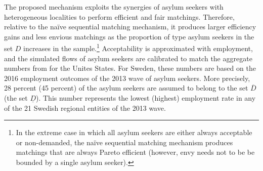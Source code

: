 \documentclass[12pt,fleqn]{article}
\begin{document}
The proposed mechanism exploits the synergies of asylum seekers with heterogeneous localities to perform efficient and fair matchings. Therefore, relative to the na\"{i}ve sequential matching mechanism, it produces larger efficiency gains and less envious matchings as the proportion of type asylum seekers in the set $D$ increases in the sample.\footnote{In the extreme case in which all asylum seekers are either always acceptable or non-demanded, the na\"{i}ve sequential matching mechanism produces matchings that are always Pareto efficient (however, envy needs not to be be bounded by a single asylum seeker).} Acceptability is approximated with employment, and the simulated flows of asylum seekers are calibrated to match the aggregate numbers from \cite{bib:BansakEtAl} for the Unites States. For Sweden, these numbers are based on the 2016 employment outcomes of the 2013 wave of asylum seekers. More precisely, 28 percent (45 percent) of the asylum seekers are assumed to belong to the set $\overline{D}$ (the set $\underline{D}$). This number represents the lowest (highest) employment rate in any of the 21 Swedish regional entities of the 2013 wave.
\end{document}
